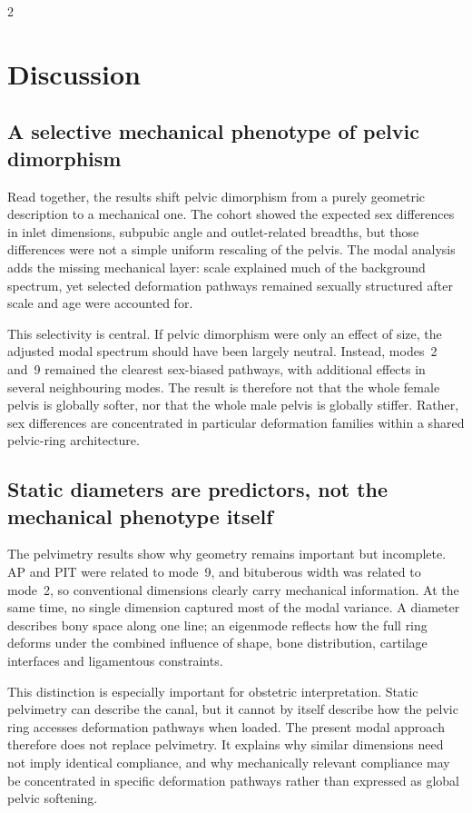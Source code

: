 \documentclass[openacc]{rsproca_new}
\begin{document}
\begin{multicols}{2}
\section{Discussion}
\subsection{A selective mechanical phenotype of pelvic dimorphism}

Read together, the results shift pelvic dimorphism from a purely geometric description to a mechanical one. The cohort showed the expected sex differences in inlet dimensions, subpubic angle and outlet-related breadths, but those differences were not a simple uniform rescaling of the pelvis. The modal analysis adds the missing mechanical layer: scale explained much of the background spectrum, yet selected deformation pathways remained sexually structured after scale and age were accounted for.

This selectivity is central. If pelvic dimorphism were only an effect of size, the adjusted modal spectrum should have been largely neutral. Instead, modes~2 and~9 remained the clearest sex-biased pathways, with additional effects in several neighbouring modes. The result is therefore not that the whole female pelvis is globally softer, nor that the whole male pelvis is globally stiffer. Rather, sex differences are concentrated in particular deformation families within a shared pelvic-ring architecture.

\subsection{Static diameters are predictors, not the mechanical phenotype itself}

The pelvimetry results show why geometry remains important but incomplete. AP and PIT were related to mode~9, and bituberous width was related to mode~2, so conventional dimensions clearly carry mechanical information. At the same time, no single dimension captured most of the modal variance. A diameter describes bony space along one line; an eigenmode reflects how the full ring deforms under the combined influence of shape, bone distribution, cartilage interfaces and ligamentous constraints.

This distinction is especially important for obstetric interpretation. Static pelvimetry can describe the canal, but it cannot by itself describe how the pelvic ring accesses deformation pathways when loaded. The present modal approach therefore does not replace pelvimetry. It explains why similar dimensions need not imply identical compliance, and why mechanically relevant compliance may be concentrated in specific deformation pathways rather than expressed as global pelvic softening.


\end{multicols}
\end{document}
